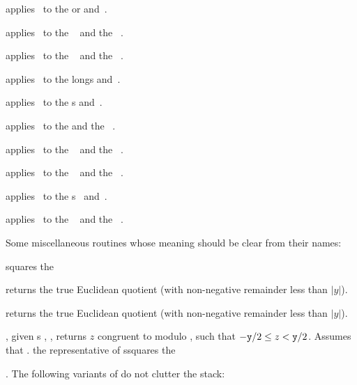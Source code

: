  applies \op\ to
the  or   and~.

 applies \op\ to the
~ and the ~.

 applies \op\ to the
~ and the ~.

 applies \op\ to the longs
 and~.

 applies \op\ to the
s  and~.

 applies \op\ to the
  and the ~.

 applies \op\ to the
~ and the ~.

 applies \op\ to the
~ and the ~.

 applies \op\ to the
s~ and~.

 applies \op\ to the
~ and the ~.

\noindent Some miscellaneous routines whose meaning should be clear from
their names:




 squares the ~

 returns the true Euclidean quotient
(with non-negative remainder less than $|y|$).

 returns the true Euclidean quotient
(with non-negative remainder less than $|y|$).

, given
s , , returns $z$ congruent to  modulo ,
such that $-{\tt y}/2 \leq z < {\tt y}/2$. Assumes that . the representative of ssquares the ~

. The following variants of  do not
clutter the stack:

